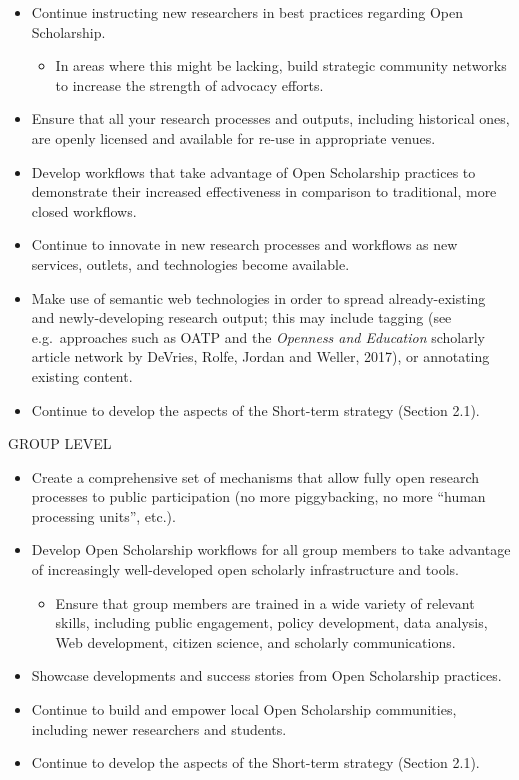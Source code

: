 \documentclass[]{article}
\providecommand{\tightlist}{%
  \setlength{\itemsep}{0pt}\setlength{\parskip}{0pt}}
\begin{document}
\begin{itemize}
\item
  Continue instructing new researchers in best practices regarding Open
  Scholarship.

  \begin{itemize}
  \tightlist
  \item
    In areas where this might be lacking, build strategic community
    networks to increase the strength of advocacy efforts.
  \end{itemize}
\item
  Ensure that all your research processes and outputs, including
  historical ones, are openly licensed and available for re-use in
  appropriate venues.
\item
  Develop workflows that take advantage of Open Scholarship practices to
  demonstrate their increased effectiveness in comparison to
  traditional, more closed workflows.
\item
  Continue to innovate in new research processes and workflows as new
  services, outlets, and technologies become available.
\item
  Make use of semantic web technologies in order to spread
  already-existing and newly-developing research output; this may
  include tagging (see e.g.~approaches such as OATP and the
  \emph{Openness and Education} scholarly article network by DeVries,
  Rolfe, Jordan and Weller, 2017), or annotating existing content.
\item
  Continue to develop the aspects of the Short-term strategy (Section
  2.1).
\end{itemize}

GROUP LEVEL

\begin{itemize}
\item
  Create a comprehensive set of mechanisms that allow fully open
  research processes to public participation (no more piggybacking, no
  more ``human processing units'', etc.).
\item
  Develop Open Scholarship workflows for all group members to take
  advantage of increasingly well-developed open scholarly infrastructure
  and tools.

  \begin{itemize}
  \tightlist
  \item
    Ensure that group members are trained in a wide variety of relevant
    skills, including public engagement, policy development, data
    analysis, Web development, citizen science, and scholarly
    communications.
  \end{itemize}
\item
  Showcase developments and success stories from Open Scholarship
  practices.
\item
  Continue to build and empower local Open Scholarship communities,
  including newer researchers and students.
\item
  Continue to develop the aspects of the Short-term strategy (Section
  2.1).
\end{itemize}
\end{document}
